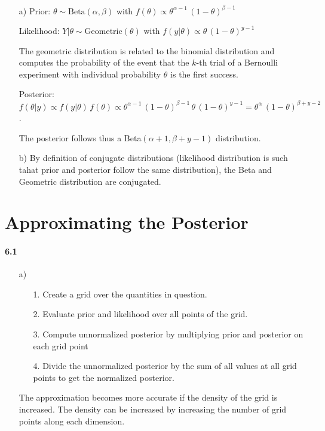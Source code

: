 \documentclass[fontsize=11pt,DIV=18,parskip=half]{scrartcl}
\begin{document}
\begin{enumerate}
\item[a)] Prior: $\theta \sim \text{Beta}(\alpha, \beta)$ with $f(\theta) \propto \theta^{\alpha-1} \, (1-\theta)^{\beta-1}$

Likelihood: $Y|\theta \sim \text{Geometric}(\theta)$ with $f(y|\theta) \propto \theta \, (1-\theta)^{y-1}$

The geometric distribution is related to the binomial distribution and computes the probability of the event that the $k$-th trial of a Bernoulli experiment with individual probability $\theta$ is the first success.

Posterior: $f(\theta|y) \propto f(y|\theta) \, f(\theta) \propto \theta^{\alpha-1} \, (1-\theta)^{\beta-1} \, \theta \, (1-\theta)^{y-1} = \theta^\alpha \, (1-\theta)^{\beta+y-2}$.

The posterior follows thus a Beta$(\alpha+1, \beta+y-1)$ distribution.

\item[b)] By definition of conjugate distributions (likelihood distribution is such tahat prior and posterior follow the same distribution), the Beta and Geometric distribution are conjugated.
\end{enumerate}

\section{Approximating the Posterior}

\paragraph{6.1}
\begin{enumerate}
\item[a)]

\begin{enumerate}
\item[1.] Create a grid over the quantities in question.
\item[2.] Evaluate prior and likelihood over all points of the grid.
\item[3.] Compute unnormalized posterior by multiplying prior and posterior on each grid point
\item[4.] Divide the unnormalized posterior by the sum of all values at all grid points to get the normalized posterior.
\end{enumerate}

The approximation becomes more accurate if the density of the grid is increased. The density can be increased by increasing the number of grid points along each dimension.
\end{enumerate}
\end{document}
